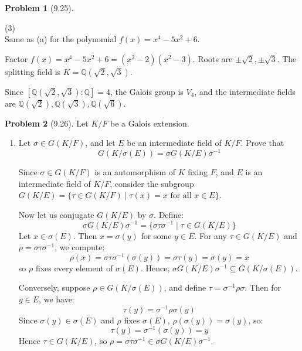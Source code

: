 \documentclass[12pt]{article}
\theoremstyle{definition}
\newtheorem{problem}{Problem}
\begin{document}
\begin{problem}[9.25]
\begin{enumerate}[label=(\alph*)]
\begin{solution}
            (3)\\
            Same as (a) for the polynomial $f(x) = x^4 - 5x^2 + 6$.

            Factor $f(x) = x^4 - 5x^2 + 6 = (x^2 - 2)(x^2 - 3)$. Roots are $\pm\sqrt{2}, \pm\sqrt{3}$. The splitting field is $K = \mathbb{Q}(\sqrt{2}, \sqrt{3})$.

            Since $[\mathbb{Q}(\sqrt{2}, \sqrt{3}) : \mathbb{Q}] = 4$, the Galois group is $V_4$, and the intermediate fields are $\mathbb{Q}(\sqrt{2}), \mathbb{Q}(\sqrt{3}), \mathbb{Q}(\sqrt{6})$.

        \end{solution}
    \end{enumerate}
\end{problem}

\begin{problem}[9.26]
    Let $K/F$ be a Galois extension.
    \begin{enumerate}[label=(\alph*)]
        \item Let $\sigma \in G(K/F)$, and let $E$ be an intermediate field of $K/F$. Prove that
              \[ 
                 G(K/\sigma(E)) = \sigma G(K/E)\sigma^{-1}
              \]
        
        \begin{solution}
            Since $\sigma \in G(K/F)$ is an automorphism of $K$ fixing $F$, and $E$ is an intermediate field of $K/F$, consider the subgroup $G(K/E) = \{\tau \in G(K/F) \mid \tau(x) = x \text{ for all } x \in E\}$.

            Now let us conjugate $G(K/E)$ by $\sigma$. Define:
            \[
            \sigma G(K/E)\sigma^{-1} = \{\sigma \tau \sigma^{-1} \mid \tau \in G(K/E)\}
            \]
            Let $x \in \sigma(E)$. Then $x = \sigma(y)$ for some $y \in E$. For any $\tau \in G(K/E)$ and $\rho = \sigma \tau \sigma^{-1}$, we compute:
            \[
            \rho(x) = \sigma \tau \sigma^{-1}(\sigma(y)) = \sigma \tau(y) = \sigma(y) = x
            \]
            so $\rho$ fixes every element of $\sigma(E)$. Hence, $\sigma G(K/E)\sigma^{-1} \subseteq G(K/\sigma(E))$.

            Conversely, suppose $\rho \in G(K/\sigma(E))$, and define $\tau = \sigma^{-1} \rho \sigma$. Then for $y \in E$, we have:
            \[
            \tau(y) = \sigma^{-1} \rho \sigma(y)
            \]
            Since $\sigma(y) \in \sigma(E)$ and $\rho$ fixes $\sigma(E)$, $\rho(\sigma(y)) = \sigma(y)$, so:
            \[
            \tau(y) = \sigma^{-1}(\sigma(y)) = y
            \]
            Hence $\tau \in G(K/E)$, so $\rho = \sigma \tau \sigma^{-1} \in \sigma G(K/E)\sigma^{-1}$.


\end{solution}
\end{enumerate}
\end{problem}
\end{document}
